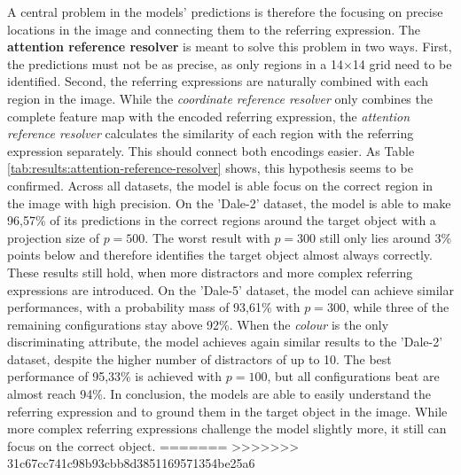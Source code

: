 \documentclass[11pt]{article}
\begin{document}
A central problem in the models' predictions is therefore the focusing on precise locations in the image and connecting them to the referring expression.
The \textbf{attention reference resolver} is meant to solve this problem in two ways.
First, the predictions must not be as precise, as only regions in a 14$\times$14 grid need to be identified.
Second, the referring expressions are naturally combined with each region in the image.
While the \emph{coordinate reference resolver} only combines the complete feature map with the encoded referring expression, the \emph{attention reference resolver} calculates the similarity of each region with the referring expression separately.
This should connect both encodings easier.
As Table \ref{tab:results:attention-reference-resolver} shows, this hypothesis seems to be confirmed.
Across all datasets, the model is able focus on the correct region in the image with high precision.
On the 'Dale-2' dataset, the model is able to make 96,57\% of its predictions in the correct regions around the target object with a projection size of $p=500$.
The worst result with $p=300$ still only lies around 3\% points below and therefore identifies the target object almost always correctly.
These results still hold, when more distractors and more complex referring expressions are introduced.
On the 'Dale-5' dataset, the model can achieve similar performances, with a probability mass of 93,61\% with $p=300$, while three of the remaining configurations stay above 92\%.
When the \emph{colour} is the only discriminating attribute, the model achieves again similar results to the 'Dale-2' dataset, despite the higher number of distractors of up to 10.
The best performance of 95,33\% is achieved with $p=100$, but all configurations beat are almost reach 94\%.
In conclusion, the models are able to easily understand the referring expression and to ground them in the target object in the image.
While more complex referring expressions challenge the model slightly more, it still can focus on the correct object.
=======
>>>>>>> 31c67cc741c98b93cbb8d3851169571354be25a6
\end{document}
